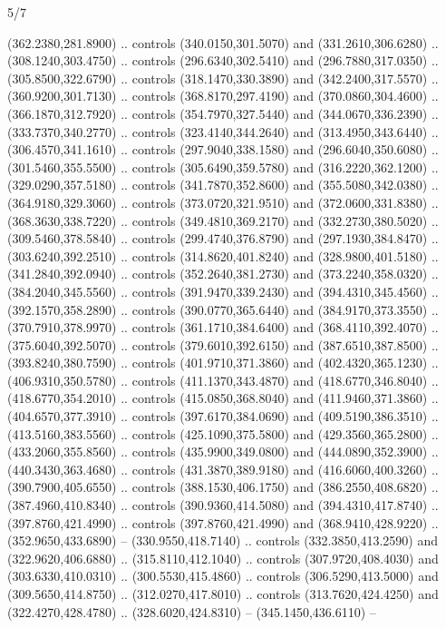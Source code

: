 \begin{flagdescription}{5/7}
\begin{scope}[xshift=0.5\flaglength]
\begin{scope}[scale=0.0019\flagwidth,yshift=190.5mm,xshift=-137.7mm]
\begin{scope}[y=0.80pt, x=0.80pt, yscale=-1, xscale=1, inner sep=0pt, outer sep=0pt]
  (362.2380,281.8900) .. controls (340.0150,301.5070) and (331.2610,306.6280) ..
  (308.1240,303.4750) .. controls (296.6340,302.5410) and (296.7880,317.0350) ..
  (305.8500,322.6790) .. controls (318.1470,330.3890) and (342.2400,317.5570) ..
  (360.9200,301.7130) .. controls (368.8170,297.4190) and (370.0860,304.4600) ..
  (366.1870,312.7920) .. controls (354.7970,327.5440) and (344.0670,336.2390) ..
  (333.7370,340.2770) .. controls (323.4140,344.2640) and (313.4950,343.6440) ..
  (306.4570,341.1610) .. controls (297.9040,338.1580) and (296.6040,350.6080) ..
  (301.5460,355.5500) .. controls (305.6490,359.5780) and (316.2220,362.1200) ..
  (329.0290,357.5180) .. controls (341.7870,352.8600) and (355.5080,342.0380) ..
  (364.9180,329.3060) .. controls (373.0720,321.9510) and (372.0600,331.8380) ..
  (368.3630,338.7220) .. controls (349.4810,369.2170) and (332.2730,380.5020) ..
  (309.5460,378.5840) .. controls (299.4740,376.8790) and (297.1930,384.8470) ..
  (303.6240,392.2510) .. controls (314.8620,401.8240) and (328.9800,401.5180) ..
  (341.2840,392.0940) .. controls (352.2640,381.2730) and (373.2240,358.0320) ..
  (384.2040,345.5560) .. controls (391.9470,339.2430) and (394.4310,345.4560) ..
  (392.1570,358.2890) .. controls (390.0770,365.6440) and (384.9170,373.3550) ..
  (370.7910,378.9970) .. controls (361.1710,384.6400) and (368.4110,392.4070) ..
  (375.6040,392.5070) .. controls (379.6010,392.6150) and (387.6510,387.8500) ..
  (393.8240,380.7590) .. controls (401.9710,371.3860) and (402.4320,365.1230) ..
  (406.9310,350.5780) .. controls (411.1370,343.4870) and (418.6770,346.8040) ..
  (418.6770,354.2010) .. controls (415.0850,368.8040) and (411.9460,371.3860) ..
  (404.6570,377.3910) .. controls (397.6170,384.0690) and (409.5190,386.3510) ..
  (413.5160,383.5560) .. controls (425.1090,375.5800) and (429.3560,365.2800) ..
  (433.2060,355.8560) .. controls (435.9900,349.0800) and (444.0890,352.3900) ..
  (440.3430,363.4680) .. controls (431.3870,389.9180) and (416.6060,400.3260) ..
  (390.7900,405.6550) .. controls (388.1530,406.1750) and (386.2550,408.6820) ..
  (387.4960,410.8340) .. controls (390.9360,414.5080) and (394.4310,417.8740) ..
  (397.8760,421.4990) .. controls (397.8760,421.4990) and (368.9410,428.9220) ..
  (352.9650,433.6890) -- (330.9550,418.7140) .. controls (332.3850,413.2590) and
  (322.9620,406.6880) .. (315.8110,412.1040) .. controls (307.9720,408.4030) and
  (303.6330,410.0310) .. (300.5530,415.4860) .. controls (306.5290,413.5000) and
  (309.5650,414.8750) .. (312.0270,417.8010) .. controls (313.7620,424.4250) and
  (322.4270,428.4780) .. (328.6020,424.8310) -- (345.1450,436.6110) --

\end{scope}
\end{scope}
\end{scope}
\end{flagdescription}
